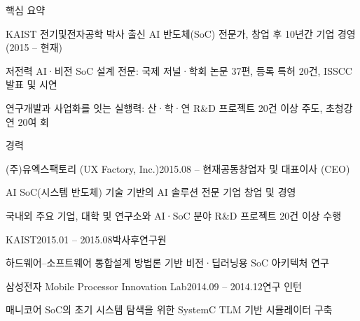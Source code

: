 \documentclass{resume-ko} %
\begin{document}


\makecvheader


\begin{section}{핵심 요약}

\begin{subsection}{}{}{}{}
\item KAIST 전기및전자공학 박사 출신 AI 반도체(SoC) 전문가, 창업 후 10년간 기업 경영 (2015 -- 현재)
\item 저전력 AI·비전 SoC 설계 전문: 국제 저널·학회 논문 37편, 등록 특허 20건, ISSCC 발표 및 시연
\item 연구개발과 사업화를 잇는 실행력: 산·학·연 R\&D 프로젝트 20건 이상 주도, 초청강연 20여 회
\end{subsection}

\end{section}


\begin{section}{경력}

\begin{subsection}{(주)유엑스팩토리 (UX Factory, Inc.)}{2015.08 -- 현재}{공동창업자 및 대표이사 (CEO)}{}
\item AI SoC(시스템 반도체) 기술 기반의 AI 솔루션 전문 기업 창업 및 경영
\item 국내외 주요 기업, 대학 및 연구소와 AI·SoC 분야 R\&D 프로젝트 20건 이상 수행
\end{subsection}

\begin{subsection}{KAIST}{2015.01 -- 2015.08}{박사후연구원}{}
\item 하드웨어--소프트웨어 통합설계 방법론 기반 비전·딥러닝용 SoC 아키텍처 연구
\end{subsection}

\begin{subsection}{삼성전자 Mobile Processor Innovation Lab}{2014.09 -- 2014.12}{연구 인턴}{}
\item 매니코어 SoC의 초기 시스템 탐색을 위한 SystemC TLM 기반 시뮬레이터 구축
\end{subsection}

\end{section}
\end{document}
